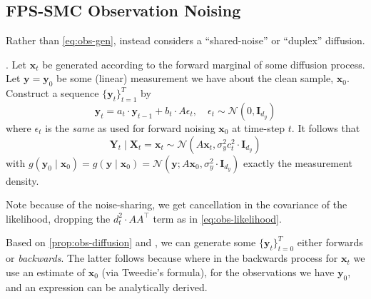 \subsection{FPS-SMC Observation Noising}

Rather than \autoref{eq:obs-gen}, \textcite{douDiffusionPosteriorSampling2023} instead considers
a ``shared-noise'' or ``duplex'' diffusion.

\begin{proposition} \label{prop:obs-diffusion}
    \textcite[Proposition B.1]{douDiffusionPosteriorSampling2023}.
    Let $\mathbf{x}_t$ be generated according to the forward marginal of some diffusion process.
    Let $\mathbf{y} = \mathbf{y}_0$ be some (linear) measurement we have about the clean sample,
    $\mathbf{x}_0$. Construct a sequence $\{\mathbf{y}_t\}_{t=1}^T$ by
    \begin{equation*}
        \mathbf{y}_t = a_t\cdot \mathbf{y}_{t-1} + b_t\cdot A\epsilon_t,\quad \epsilon_t \sim \mathcal{N}(0, \mathbf{I}_{d_y})
    \end{equation*}
    where $\epsilon_t$ is the \emph{same} as used for forward noising $\mathbf{x}_0$ at time-step $t$.
    It follows that
    \begin{equation}
        \mathbf{Y}_t \mid \mathbf{X}_t = \mathbf{x}_t \sim \mathcal{N}(A\mathbf{x}_t, \sigma_y^2c_t^2\cdot \mathbf{I}_{d_y}) \label{eq:obs-likelihood-dou}
    \end{equation}
    with $g(\mathbf{y}_0 \mid \mathbf{x}_0) = g(\mathbf{y} \mid \mathbf{x}_0) = \mathcal{N}(\mathbf{y}; A\mathbf{x}_0, \sigma_y^2\cdot \mathbf{I}_{d_y})$
    exactly the measurement density.
\end{proposition}

Note because of the noise-sharing, we get cancellation in the covariance of the likelihood, dropping
the $d_t^2\cdot AA^\top$ term as in \autoref{eq:obs-likelihood}.

Based on \autoref{prop:obs-diffusion} and \textcite[Remark B.1]{douDiffusionPosteriorSampling2023},
we can generate some $\{\mathbf{y}_t\}_{t=0}^T$ either forwards or \emph{backwards}.
The latter follows because where in the backwards process for $\mathbf{x}_t$ we use an estimate of
$\mathbf{x}_0$ (via Tweedie's formula), for the observations we have $\mathbf{y}_0$, and an
expression can be analytically derived.
